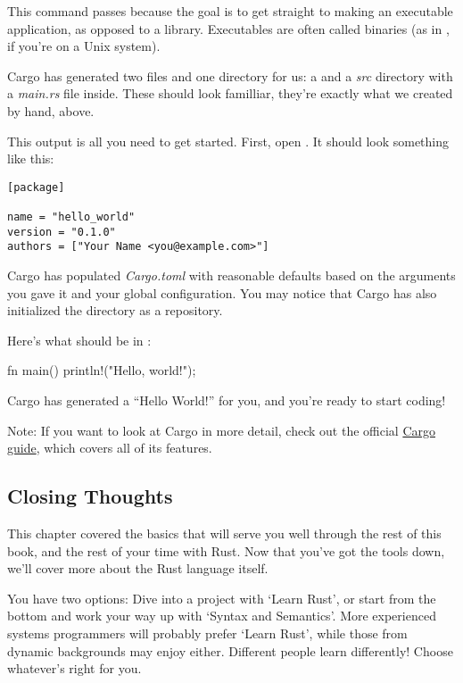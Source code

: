 This command passes  because the goal is to get straight to making an executable application, as opposed to a 
library. Executables are often called binaries (as in , if you’re on a Unix system).

\blank

Cargo has generated two files and one directory for us: a  and a \emph{src} directory with a \emph{main.rs}
file inside. These should look familliar, they’re exactly what we created by hand, above.

\blank

This output is all you need to get started. First, open . It should look something like this:

\begin{verbatim}
[package]

name = "hello_world"
version = "0.1.0"
authors = ["Your Name <you@example.com>"]  
\end{verbatim}

Cargo has populated \emph{Cargo.toml} with reasonable defaults based on the arguments you gave it and your 
global configuration. You may notice that Cargo has also initialized the  directory as a  
repository.

\blank

Here’s what should be in :

\begin{rustc}
fn main() {
    println!("Hello, world!");
}
\end{rustc}

Cargo has generated a \enquote{Hello World!} for you, and you’re ready to start coding!

\begin{myquote}
Note: If you want to look at Cargo in more detail, check out the official \href{http://doc.crates.io/guide.html}{Cargo guide}, 
which covers all of its features.
\end{myquote}

\subsection{Closing Thoughts}

This chapter covered the basics that will serve you well through the rest of this book, and the rest of your time with Rust. 
Now that you’ve got the tools down, we'll cover more about the Rust language itself.

\blank

You have two options: Dive into a project with ‘Learn Rust’, or start from the bottom and work your way up with 
‘Syntax and Semantics’. More experienced systems programmers will probably prefer ‘Learn Rust’, while those from 
dynamic backgrounds may enjoy either. Different people learn differently! Choose whatever’s right for you.
